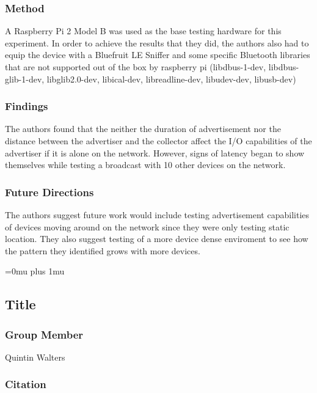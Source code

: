 \subsubsection{Method}

\noindent
A Raspberry Pi 2 Model B was used as the base testing hardware for this experiment. In order to achieve the results that they did, the authors also had to equip the device with a Bluefruit LE Sniffer and some specific Bluetooth libraries that are not supported out of the box by raspberry pi (libdbus-1-dev,  libdbus-glib-1-dev,  libglib2.0-dev,  libical-dev, libreadline-dev, libudev-dev, libusb-dev)

\subsubsection{Findings}

\noindent
The authors found that the neither the duration of advertisement nor the distance between the advertiser and the collector affect the I/O capabilities of the advertiser if it is alone on the network. However, signs of latency began to show themselves while testing a broadcast with 10 other devices on the network.

\subsubsection{Future Directions}

\noindent
The authors suggest future work would include testing advertisement capabilities of devices moving around on the network since they were only testing static location. They also suggest testing of a more device dense enviroment to see how the pattern they identified grows with more devices.

\Urlmuskip=0mu plus 1mu\relax

\noindent
\subsection{Title}

\subsubsection{Group Member}

\noindent
Quintin Walters

\noindent
\subsubsection{Citation}

